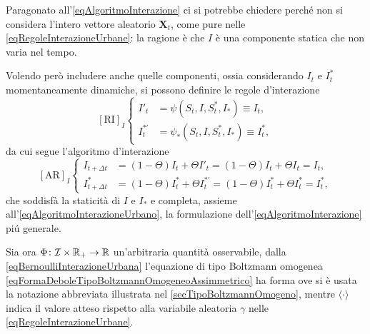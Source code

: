         \begin{oss}
          Paragonato all'\ref{eqAlgoritmoInterazione} ci si potrebbe chiedere perché non si considera l'intero vettore aleatorio \(\mathbf X_t\), come pure nelle \ref{eqRegoleInterazioneUrbane}: la ragione è che \(I\) è una componente statica che non varia nel tempo.
        
          Volendo però includere anche quelle componenti, ossia considerando \(I_t\) e \(I^*_t\) momentaneamente dinamiche, si possono definire le regole d'interazione
          \[
            [\text{RI}]_I\left\{
            \begin{aligned}
              I'_t&=\psi(S_t,I,S^*_t,I_*)\equiv I_t,\\
              I^{*\prime}_t&=\psi_*(S_t,I,S^*_t,I_*)\equiv I_t^*,
            \end{aligned}\right.
          \]
          da cui segue l'algoritmo d'interazione
          \[
            [\text{AR}]_I\left\{
            \begin{aligned}
              I_{t+\Delta t}&=(1-\Theta)I_t+\Theta I'_t=(1-\Theta)I_t+\Theta I_t=I_t,\\
              I^*_{t+\Delta t}&=(1-\Theta)I^*_t+\Theta I^{*\prime}_t=(1-\Theta)I^*_t+\Theta I^*_t=I^*_t,
            \end{aligned}\right.
          \]
          che soddisfà la staticità di \(I\) e \(I_*\) e completa, assieme all'\ref{eqAlgoritmoInterazioneUrbano}, la formulazione dell'\ref{eqAlgoritmoInterazione} piú generale.
        \end{oss}

        Sia ora \(\Phi\colon\mathcal I\times\mathbb R_+\to\mathbb R\) un'arbitraria quantità osservabile, dalla \ref{eqBernoulliInterazioneUrbana} l'equazione di tipo Boltzmann omogenea \ref{eqFormaDeboleTipoBoltzmannOmogeneoAssimmetrico} ha forma
        ove si è usata la notazione abbreviata illustrata nel \cref{secTipoBoltzmannOmogeno}, mentre \(\langle\cdot\rangle\) indica il valore atteso rispetto alla variabile aleatoria \(\gamma\) nelle \ref{eqRegoleInterazioneUrbane}.


